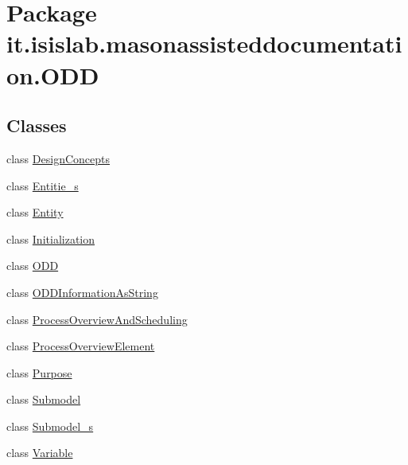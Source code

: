 \hypertarget{namespaceit_1_1isislab_1_1masonassisteddocumentation_1_1_o_d_d}{\section{Package it.\-isislab.\-masonassisteddocumentation.\-O\-D\-D}
\label{namespaceit_1_1isislab_1_1masonassisteddocumentation_1_1_o_d_d}
}
\subsection*{Classes}
\begin{DoxyCompactItemize}
\item 
class \hyperlink{classit_1_1isislab_1_1masonassisteddocumentation_1_1_o_d_d_1_1_design_concepts}{Design\-Concepts}
\item 
class \hyperlink{classit_1_1isislab_1_1masonassisteddocumentation_1_1_o_d_d_1_1_entitie__s}{Entitie\-\_\-s}
\item 
class \hyperlink{classit_1_1isislab_1_1masonassisteddocumentation_1_1_o_d_d_1_1_entity}{Entity}
\item 
class \hyperlink{classit_1_1isislab_1_1masonassisteddocumentation_1_1_o_d_d_1_1_initialization}{Initialization}
\item 
class \hyperlink{classit_1_1isislab_1_1masonassisteddocumentation_1_1_o_d_d_1_1_o_d_d}{O\-D\-D}
\item 
class \hyperlink{classit_1_1isislab_1_1masonassisteddocumentation_1_1_o_d_d_1_1_o_d_d_information_as_string}{O\-D\-D\-Information\-As\-String}
\item 
class \hyperlink{classit_1_1isislab_1_1masonassisteddocumentation_1_1_o_d_d_1_1_process_overview_and_scheduling}{Process\-Overview\-And\-Scheduling}
\item 
class \hyperlink{classit_1_1isislab_1_1masonassisteddocumentation_1_1_o_d_d_1_1_process_overview_element}{Process\-Overview\-Element}
\item 
class \hyperlink{classit_1_1isislab_1_1masonassisteddocumentation_1_1_o_d_d_1_1_purpose}{Purpose}
\item 
class \hyperlink{classit_1_1isislab_1_1masonassisteddocumentation_1_1_o_d_d_1_1_submodel}{Submodel}
\item 
class \hyperlink{classit_1_1isislab_1_1masonassisteddocumentation_1_1_o_d_d_1_1_submodel__s}{Submodel\-\_\-s}
\item 
class \hyperlink{classit_1_1isislab_1_1masonassisteddocumentation_1_1_o_d_d_1_1_variable}{Variable}
\end{DoxyCompactItemize}
